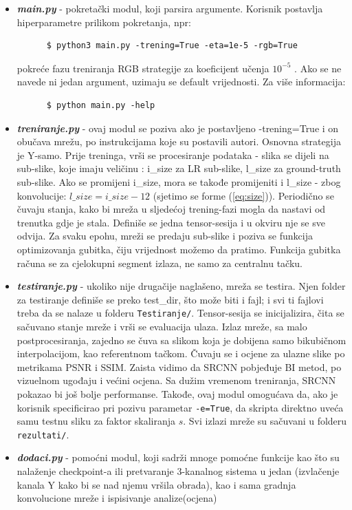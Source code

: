 \documentclass[12pt]{report}
\numberwithin{equation}{section}
\begin{document}
  \begin{itemize}
  
   \item \textit{\textbf{main.py}} - pokretački modul, koji parsira argumente. Korisnik postavlja hiperparametre prilikom pokretanja, npr: 
   \begin{lstlisting}
      $ python3 main.py -trening=True -eta=1e-5 -rgb=True
   \end{lstlisting}
    pokreće fazu treniranja RGB strategije za koeficijent učenja $10^{-5}$ . Ako se ne navede ni jedan argument, uzimaju se default vrijednosti. Za više informacija:
     \begin{lstlisting}
      $ python main.py -help
   \end{lstlisting}
    \item \textit{\textbf{treniranje.py}} - ovaj modul se poziva ako je postavljeno -trening=True i on obučava mrežu, po instrukcijama koje su postavili autori. Osnovna strategija je Y-samo. Prije treninga, vrši se procesiranje podataka - slika se dijeli na sub-slike, koje imaju veličinu : i\_size za LR sub-slike, l\_size za ground-truth sub-slike. Ako se promijeni i\_size, mora se takođe promijeniti i l\_size - zbog konvolucije: $l\_size=i\_size-12$ (sjetimo se forme (\ref{eq:size})). Periodično se čuvaju stanja, kako bi mreža u sljedećoj trening-fazi mogla da nastavi od trenutka gdje je stala. Definiše se jedna tensor-sesija i u okviru nje se sve odvija. Za svaku epohu,  mreži se predaju sub-slike i poziva se funkcija optimizovanja gubitka, čiju vrijednost možemo da pratimo. Funkcija gubitka računa se za cjelokupni segment izlaza, ne samo za centralnu tačku.  
    
    \item \textbf{\textit{testiranje.py}} - ukoliko nije drugačije naglašeno, mreža se testira. Njen folder za testiranje definiše se preko test\_dir, što može biti i fajl; i svi ti fajlovi treba da se nalaze u folderu \texttt{Testiranje/}.  Tensor-sesija se inicijalizira, čita se sačuvano stanje mreže i vrši se evaluacija ulaza. Izlaz mreže, sa malo postprocesiranja, zajedno se čuva sa slikom koja je dobijena samo bikubičnom interpolacijom, kao referentnom tačkom. Čuvaju se i ocjene za ulazne slike po metrikama PSNR i SSIM. Zaista vidimo da SRCNN pobjeđuje BI metod, po vizuelnom ugođaju i većini ocjena. Sa dužim vremenom treniranja, SRCNN pokazao bi još bolje performanse.  Takođe, ovaj modul omogućava da, ako je korisnik specificirao pri pozivu parametar \texttt{-e=True}, da skripta direktno uveća samu testnu sliku za faktor skaliranja $s$. Svi izlazi mreže su sačuvani u folderu \texttt{rezultati/}.
    
    \item \textit{\textbf{dodaci.py}} - pomoćni modul, koji sadrži mnoge pomoćne funkcije kao što su nalaženje checkpoint-a ili pretvaranje 3-kanalnog sistema u jedan (izvlačenje kanala Y kako bi se nad njemu vršila obrada), kao i sama gradnja konvolucione mreže i ispisivanje analize(ocjena)
  \end{itemize}
  
\end{document}
